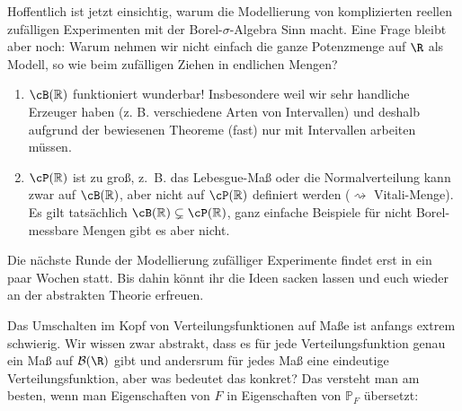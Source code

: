 Hoffentlich ist jetzt einsichtig, warum die Modellierung von komplizierten reellen zuf\"alligen Experimenten mit der Borel-$\sigma$-Algebra Sinn macht. Eine Frage bleibt aber noch: Warum nehmen wir nicht einfach die ganze Potenzmenge auf $\R$ als Modell, so wie beim zuf\"alligen Ziehen in endlichen Mengen?
\begin{bem}
	\begin{enumerate}[label=(\roman*)]
		\item $\cB(\mathbb{R})$ funktioniert wunderbar! Insbesondere weil wir sehr handliche Erzeuger haben (z. B. verschiedene Arten von Intervallen) und deshalb aufgrund der bewiesenen Theoreme (fast) nur mit Intervallen arbeiten m\"ussen.
				\item $\cP(\mathbb{R})$ ist zu groß, \mbox{z. B.} das Lebesgue-Maß oder die Normalverteilung kann zwar auf $\cB(\mathbb{R})$, aber nicht auf $\cP(\mathbb{R})$ definiert werden ($\rightsquigarrow$ Vitali-Menge). Es gilt tats\"achlich $\cB(\mathbb{R}) \subsetneq \cP(\mathbb{R})$, ganz einfache Beispiele f\"ur nicht Borel-messbare Mengen gibt es aber nicht.
	\end{enumerate}
\end{bem}

Die n\"achste Runde der Modellierung zuf\"alliger Experimente findet erst in ein paar Wochen statt. Bis dahin k\"onnt ihr die Ideen sacken lassen und euch wieder an der abstrakten Theorie erfreuen.\smallskip




Das Umschalten im Kopf von Verteilungsfunktionen auf Ma\ss e ist anfangs extrem schwierig. Wir wissen zwar abstrakt, dass es f\"ur jede Verteilungsfunktion genau ein Ma\ss{} auf $\mathcal B(\R)$ gibt und andersrum f\"ur jedes Ma\ss{} eine eindeutige Verteilungsfunktion, aber was bedeutet das konkret? Das versteht man am besten, wenn man Eigenschaften von $F$ in Eigenschaften von $\mathbb P_F$ \"ubersetzt:

